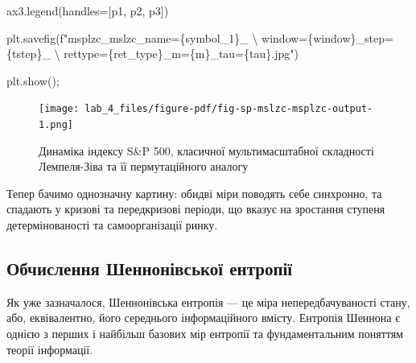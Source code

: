 \documentclass[
  letterpaper,
]{report}
\newenvironment{Shaded}{\begin{snugshade}}{\end{snugshade}}
\newcommand{\CharTok}[1]{\textcolor[rgb]{0.13,0.47,0.30}{#1}}
\newcommand{\NormalTok}[1]{\textcolor[rgb]{0.00,0.23,0.31}{#1}}
\newcommand{\OperatorTok}[1]{\textcolor[rgb]{0.37,0.37,0.37}{#1}}
\newcommand{\SpecialCharTok}[1]{\textcolor[rgb]{0.37,0.37,0.37}{#1}}
\newcommand{\SpecialStringTok}[1]{\textcolor[rgb]{0.13,0.47,0.30}{#1}}
\begin{document}
\begin{Shaded}
\begin{Highlighting}[]
\NormalTok{ax3.legend(handles}\OperatorTok{=}\NormalTok{[p1, p2, p3])}

\NormalTok{plt.savefig(}\SpecialStringTok{f"msplzc\_mslzc\_name=}\SpecialCharTok{\{}\NormalTok{symbol\_1}\SpecialCharTok{\}}\SpecialStringTok{\_ }\CharTok{\textbackslash{}}
\SpecialStringTok{    window=}\SpecialCharTok{\{}\NormalTok{window}\SpecialCharTok{\}}\SpecialStringTok{\_step=}\SpecialCharTok{\{}\NormalTok{tstep}\SpecialCharTok{\}}\SpecialStringTok{\_ }\CharTok{\textbackslash{}}
\SpecialStringTok{    rettype=}\SpecialCharTok{\{}\NormalTok{ret\_type}\SpecialCharTok{\}}\SpecialStringTok{\_m=}\SpecialCharTok{\{}\NormalTok{m}\SpecialCharTok{\}}\SpecialStringTok{\_tau=}\SpecialCharTok{\{}\NormalTok{tau}\SpecialCharTok{\}}\SpecialStringTok{.jpg"}\NormalTok{)}

\NormalTok{plt.show()}\OperatorTok{;}
\end{Highlighting}
\end{Shaded}

\begin{figure}[H]

{\centering \texttt{[image: lab\_4\_files/figure-pdf/fig-sp-mslzc-msplzc-output-1.png]}

}

\caption{\label{fig-sp-mslzc-msplzc}Динаміка індексу S\&P 500, класичної
мультимасштабної складності Лемпеля-Зіва та її пермутаційного аналогу}

\end{figure}

Тепер бачимо однозначну картину: обидві міри поводять себе синхронно, та
спадають у кризові та передкризові періоди, що вказує на зростання
ступеня детермінованості та самоорганізації ринку.

\hypertarget{ux43eux431ux447ux438ux441ux43bux435ux43dux43dux44f-ux448ux435ux43dux43dux43eux43dux456ux432ux441ux44cux43aux43eux457-ux435ux43dux442ux440ux43eux43fux456ux457}{%
\subsection{Обчислення Шеннонівської
ентропії}\label{ux43eux431ux447ux438ux441ux43bux435ux43dux43dux44f-ux448ux435ux43dux43dux43eux43dux456ux432ux441ux44cux43aux43eux457-ux435ux43dux442ux440ux43eux43fux456ux457}}

Як уже зазначалося, Шеннонівська ентропія --- це міра непередбачуваності
стану, або, еквівалентно, його середнього інформаційного вмісту.
Ентропія Шеннона є однією з перших і найбільш базових мір ентропії та
фундаментальним поняттям теорії інформації.
\end{document}
